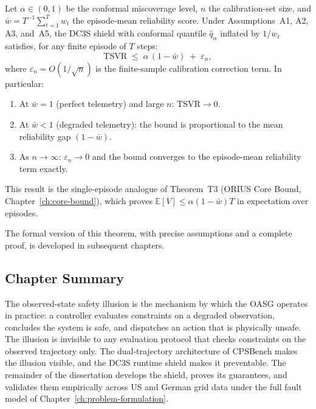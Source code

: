 \begin{theorem}
\label{thm:dc3s-informal}
Let $\alpha \in (0,1)$ be the conformal miscoverage level, $n$ the
calibration-set size, and $\bar{w} = T^{-1}\sum_{t=1}^T w_t$ the
episode-mean reliability score.  Under Assumptions~A1, A2, A3, and~A5,
the DC3S shield with conformal quantile $\hat{q}_\alpha$ inflated by
$1/w_t$ satisfies, for any finite episode of $T$ steps:
\[
  \mathrm{TSVR} \;\le\; \alpha\,(1 - \bar{w}) \;+\; \varepsilon_n,
\]
where $\varepsilon_n = O(1/\sqrt{n})$ is the finite-sample calibration
correction term.  In particular:
\begin{enumerate}
  \item At $\bar{w} = 1$ (perfect telemetry) and large $n$:
    $\mathrm{TSVR} \to 0$.
  \item At $\bar{w} < 1$ (degraded telemetry): the bound is
    proportional to the mean reliability gap $(1 - \bar{w})$.
  \item As $n \to \infty$: $\varepsilon_n \to 0$ and the bound
    converges to the episode-mean reliability term exactly.
\end{enumerate}
This result is the single-episode analogue of Theorem~T3
(ORIUS Core Bound, Chapter~\ref{ch:core-bound}), which proves
$\mathbb{E}[V] \le \alpha(1-\bar{w})T$ in expectation over episodes.
\end{theorem}

The formal version of this theorem, with precise assumptions and a
complete proof, is developed in subsequent chapters.

\subsection{Chapter Summary}

The observed-state safety illusion is the mechanism by which the OASG
operates in practice: a controller evaluates constraints on a degraded
observation, concludes the system is safe, and dispatches an action that
is physically unsafe.  The illusion is invisible to any evaluation
protocol that checks constraints on the observed trajectory only.  The
dual-trajectory architecture of CPSBench makes the illusion visible, and
the DC3S runtime shield makes it preventable.  The remainder of the
dissertation develops the shield, proves its guarantees, and validates
them empirically across US and German grid data under the full fault model
of Chapter~\ref{ch:problem-formulation}.



